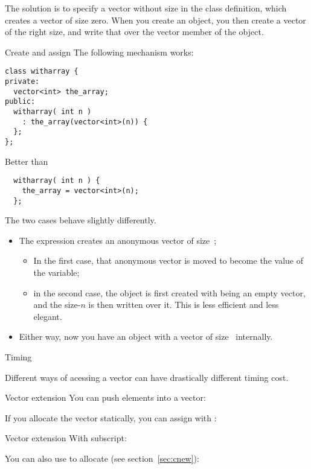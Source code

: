 The solution is to specify a vector without size in the class
definition, which creates a vector of size zero. When you create an
object, you then create a vector of the right size, and write that
over the vector member of the object.

\begin{block}{Create and assign}
  \label{sl:class-has-vector}
  The following mechanism works:
\begin{lstlisting}
class witharray {
private:
  vector<int> the_array;
public:
  witharray( int n )
    : the_array(vector<int>(n)) {
  };
};
\end{lstlisting}
Better than
\begin{lstlisting}
  witharray( int n ) {
    the_array = vector<int>(n);
  };
\end{lstlisting}
\end{block}

The two cases behave slightly differently.
\begin{itemize}
\item The expression  creates an anonymous vector
  of size~;
  \begin{itemize}
  \item In the first case, that anonymous vector is moved to become
    the value of the  variable;
  \item in the second case, the object is first created with
     being an empty
    vector, and the size-$n$ is then written over it. This is less
    efficient and less elegant.
  \end{itemize}
\item Either way, now you have an object with a vector of size~ internally.
\end{itemize}

 {Timing}

Different ways of acessing a vector can have drastically different
timing cost.

\begin{block}{Vector extension}
  \label{sl:vect-extend-code}
  You can push elements into a vector:

  If you allocate the vector statically, you can assign with :
\end{block}

\begin{block}{Vector extension}
  \label{sl:vect-extend-code2}
  With subscript:

  You can also use  to allocate (see section~\ref{sec:cnew}):
\end{block}

